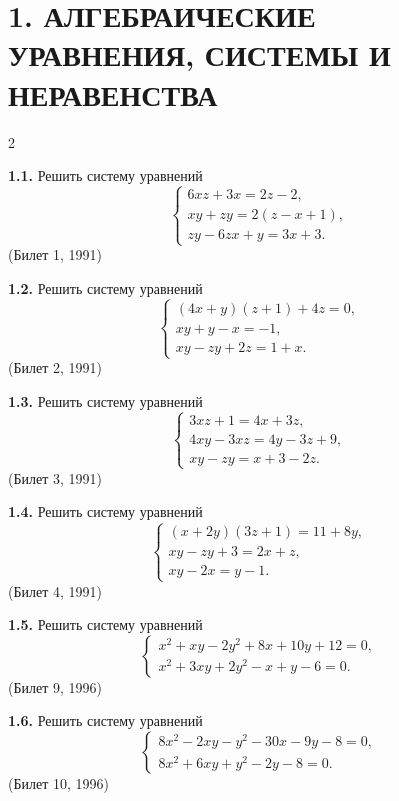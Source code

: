 \documentclass[14pt,a4paper,landscape]{extarticle}
\begin{document}
\fontsize{10}{13pt}\selectfont

\section*{1. АЛГЕБРАИЧЕСКИЕ УРАВНЕНИЯ, СИСТЕМЫ И НЕРАВЕНСТВА}

\setlength{\columnsep}{2cm}
\setlength{\columnseprule}{0.4pt}

\begin{multicols}{2}

\textbf{1.1.} Решить систему уравнений
\[
\begin{cases}
6xz + 3x = 2z - 2, \\
xy + zy = 2(z - x + 1), \\
zy - 6zx + y = 3x + 3.
\end{cases}
\]
\hfill \textnormal{(Билет 1, 1991)}

\textbf{1.2.} Решить систему уравнений
\[
\begin{cases}
(4x + y)(z + 1) + 4z = 0, \\
xy + y - x = -1, \\
xy - zy + 2z = 1 + x.
\end{cases}
\]
\hfill \textnormal{(Билет 2, 1991)}

\textbf{1.3.} Решить систему уравнений
\[
\begin{cases}
3xz + 1 = 4x + 3z, \\
4xy - 3xz = 4y - 3z + 9, \\
xy - zy = x + 3 - 2z.
\end{cases}
\]
\hfill \textnormal{(Билет 3, 1991)}

\textbf{1.4.} Решить систему уравнений
\[
\begin{cases}
(x + 2y)(3z + 1) = 11 + 8y, \\
xy - zy + 3 = 2x + z, \\
xy - 2x = y - 1.
\end{cases}
\]
\hfill \textnormal{(Билет 4, 1991)}

\textbf{1.5.} Решить систему уравнений
\[
\begin{cases}
x^2 + xy - 2y^2 + 8x + 10y + 12 = 0, \\
x^2 + 3xy + 2y^2 - x + y - 6 = 0.
\end{cases}
\]
\hfill \textnormal{(Билет 9, 1996)}

\textbf{1.6.} Решить систему уравнений
\[
\begin{cases}
8x^2 - 2xy - y^2 - 30x - 9y - 8 = 0, \\
8x^2 + 6xy + y^2 - 2y - 8 = 0.
\end{cases}
\]
\hfill \textnormal{(Билет 10, 1996)}


\end{multicols}
\end{document}
